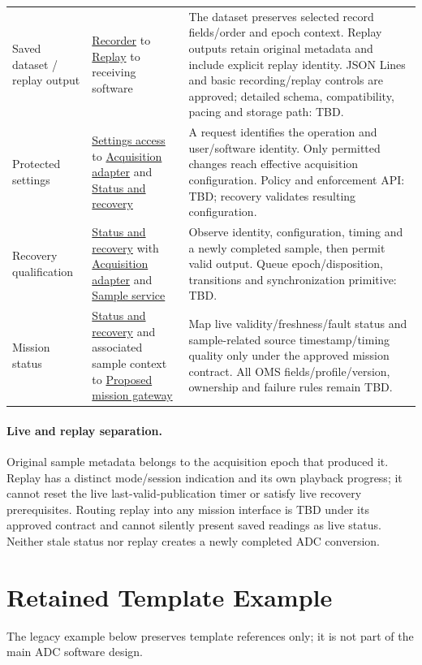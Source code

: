 \begin{landscape}
\begin{tabularx}{\linewidth}{L{3.6cm}Y Y}
Saved dataset / replay output & \hyperref[Component:SW-05]{Recorder} to \hyperref[Component:SW-06]{Replay} to receiving software & The dataset preserves selected record fields/order and epoch context. Replay outputs retain original metadata and include explicit replay identity. JSON Lines and basic recording/replay controls are approved; detailed schema, compatibility, pacing and storage path: TBD.\\
Protected settings & \hyperref[Component:SW-07]{Settings access} to \hyperref[Component:SW-01]{Acquisition adapter} and \hyperref[Component:SW-04]{Status and recovery} & A request identifies the operation and user/software identity. Only permitted changes reach effective acquisition configuration. Policy and enforcement API: TBD; recovery validates resulting configuration.\\
Recovery qualification & \hyperref[Component:SW-04]{Status and recovery} with \hyperref[Component:SW-01]{Acquisition adapter} and \hyperref[Component:SW-02]{Sample service} & Observe identity, configuration, timing and a newly completed sample, then permit valid output. Queue epoch/disposition, transitions and synchronization primitive: TBD.\\
Mission status & \hyperref[Component:SW-04]{Status and recovery} and associated sample context to \hyperref[Component:SW-08]{Proposed mission gateway} & Map live validity/freshness/fault status and sample-related source timestamp/timing quality only under the approved mission contract. All OMS fields/profile/version, ownership and failure rules remain TBD.\\
\end{tabularx}
\normalsize
\end{landscape}
\paragraph{Live and replay separation.}
Original sample metadata belongs to the acquisition epoch that produced it.
Replay has a distinct mode/session indication and its own playback progress;
it cannot reset the live last-valid-publication timer or satisfy live recovery
prerequisites. Routing replay into any mission interface is TBD under its
approved contract and cannot silently present saved readings as live status.
Neither stale status nor replay creates a newly completed ADC conversion.

\section{Retained Template Example}
The legacy example below preserves template references only; it is not part of
the main ADC software design.
